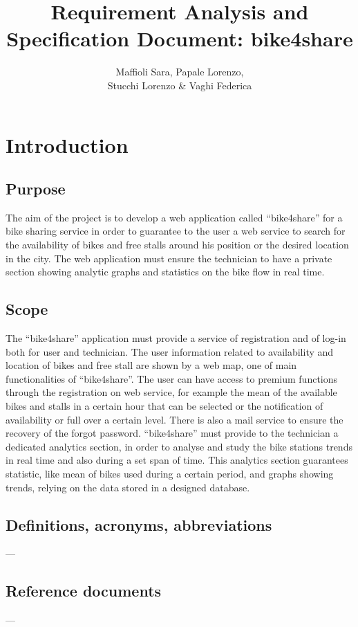 \documentclass{article}
\title{Requirement Analysis and Specification Document: bike4share}
\author{Maffioli Sara, Papale Lorenzo, \\ Stucchi Lorenzo \& Vaghi Federica}
\begin{document}
\maketitle
\tableofcontents

\newpage

\section{Introduction}
\subsection{Purpose}
The aim of the project is to develop a web application called “bike4share” for a bike sharing service in order to guarantee to the user a web service to search for the availability of bikes and free stalls around his position or the desired location in the city. The web application must ensure the technician to have a private section showing analytic graphs and statistics on the bike flow in real time.
\subsection{Scope}
The “bike4share” application must provide a service of registration and of log-in both for user and technician. The user information related to availability and location of bikes and free stall are shown by a web map, one of main functionalities of “bike4share”. The user can have access to premium functions through the registration on web service, for example the mean of the available bikes and stalls in a certain hour that can be selected or the notification of availability or full over a certain level. There is also a mail service to ensure the recovery of the forgot password.
“bike4share” must provide to the technician a dedicated analytics section, in order to analyse and study the bike stations trends in real time and also during a set span of time. This analytics section guarantees statistic, like mean of bikes used during a certain period, and graphs showing trends, relying on the data stored in a designed database.
\subsection{Definitions, acronyms, abbreviations}
---
\subsection{Reference documents}
---
\end{document}
